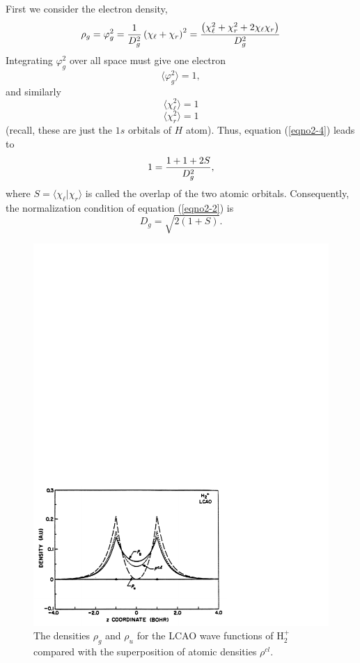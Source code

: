 First we consider the electron density,
\begin{equation}
\rho_g = \varphi^2_g = {1 \over D^2_g} \left( \chi_{\ell} + 
\chi_r \right)^2 = {\left( \chi^2_{\ell} + \chi^2_r + 2 
\chi_{\ell} \chi_r \right) \over D^2_g}
\label{eqno2-4}
\end{equation}
Integrating $\varphi^2_g$ over all space must give one electron
\begin{equation}
\langle \varphi^2_g \rangle = 1,
\end{equation}
and similarly
\begin{equation}
\langle \chi^2_{\ell} \rangle = 1
\end{equation}
\begin{equation}
\langle \chi^2_r \rangle = 1
\end{equation}
(recall, these are just the $1s$ orbitals of $H$ atom). Thus, equation
(\ref{eqno2-4}) leads to
\begin{equation}
1 = {1 + 1 + 2S \over D^2_g},
\end{equation}
where $S = \langle \chi_\ell\vert\chi_r \rangle$ is called the overlap
of the two atomic orbitals. Consequently, the normalization condition
of equation (\ref{eqno2-2}) is
\begin{equation}
D_g = \sqrt{2(1+S)}.
\end{equation}

\begin{figure}
\includegraphics[scale=0.75]{fig2-03}
\caption{The densities $\rho_g$ and $\rho_u$ for the LCAO wave
  functions of H$_2^+$ compared with the superposition of atomic
  densities $\rho^{cl}$.}
\label{fig2-3}
\end{figure}

